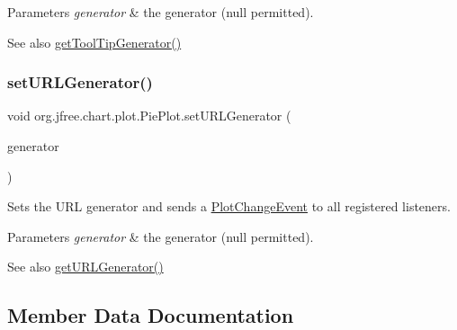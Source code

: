 \begin{DoxyParams}{Parameters}
{\em generator} & the generator ({\ttfamily null} permitted).\\
\hline
\end{DoxyParams}
\begin{DoxySeeAlso}{See also}
\mbox{\hyperlink{classorg_1_1jfree_1_1chart_1_1plot_1_1_pie_plot_a75d9625162da953ddd01905de9805a25}{get\+Tool\+Tip\+Generator()}} 
\end{DoxySeeAlso}
\mbox{\label{classorg_1_1jfree_1_1chart_1_1plot_1_1_pie_plot_ab62afb77f16e5fe72a997e92a093da6d}} 
\subsubsection{\texorpdfstring{set\+U\+R\+L\+Generator()}{setURLGenerator()}}
{\footnotesize\ttfamily void org.\+jfree.\+chart.\+plot.\+Pie\+Plot.\+set\+U\+R\+L\+Generator (\begin{DoxyParamCaption}\item[{\mbox{\hyperlink{interfaceorg_1_1jfree_1_1chart_1_1urls_1_1_pie_u_r_l_generator}{Pie\+U\+R\+L\+Generator}}}]{generator }\end{DoxyParamCaption})}

Sets the U\+RL generator and sends a \mbox{\hyperlink{}{Plot\+Change\+Event}} to all registered listeners.


\begin{DoxyParams}{Parameters}
{\em generator} & the generator ({\ttfamily null} permitted).\\
\hline
\end{DoxyParams}
\begin{DoxySeeAlso}{See also}
\mbox{\hyperlink{classorg_1_1jfree_1_1chart_1_1plot_1_1_pie_plot_a220bcaff244eda547e1c31db90ae60a8}{get\+U\+R\+L\+Generator()}} 
\end{DoxySeeAlso}


\subsection{Member Data Documentation}
\mbox{\label{classorg_1_1jfree_1_1chart_1_1plot_1_1_pie_plot_a78bbd2f5386299a7a6d22977deb387b4}} 
